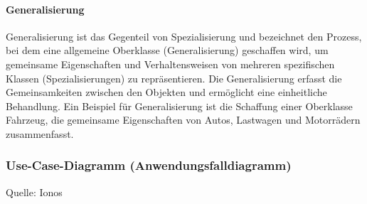 \paragraph{Generalisierung}

Generalisierung ist das Gegenteil von Spezialisierung und bezeichnet den Prozess, bei dem eine allgemeine Oberklasse (Generalisierung) geschaffen wird, um gemeinsame Eigenschaften und Verhaltensweisen von mehreren spezifischen Klassen (Spezialisierungen) zu repräsentieren. Die Generalisierung erfasst die Gemeinsamkeiten zwischen den Objekten und ermöglicht eine einheitliche Behandlung. Ein Beispiel für Generalisierung ist die Schaffung einer Oberklasse Fahrzeug, die gemeinsame Eigenschaften von Autos, Lastwagen und Motorrädern zusammenfasst.


\subsubsection{Use-Case-Diagramm (Anwendungsfalldiagramm)}
\label{sec:UseCaseDiagramm}

Quelle: Ionos \cite{IonosUseCase}

